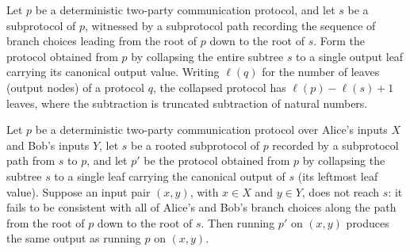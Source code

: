 \begin{lemma}
\label{CommunicationComplexity.Deterministic.Protocol.erasePath_numLeaves}
\leanok
{}
Let $p$ be a deterministic two-party communication protocol, and let $s$ be a
subprotocol of $p$, witnessed by a subprotocol path recording the sequence of branch
choices leading from the root of $p$ down to the root of $s$. Form the protocol obtained
from $p$ by collapsing the entire subtree $s$ to a single output leaf carrying its
canonical output value. Writing $\ell(q)$ for the number of leaves (output nodes) of a
protocol $q$, the collapsed protocol has $\ell(p) - \ell(s) + 1$ leaves, where the
subtraction is truncated subtraction of natural numbers.
\end{lemma}

\begin{lemma}
\label{CommunicationComplexity.Deterministic.Protocol.erasePath_run_outside}
\leanok
{}
Let $p$ be a deterministic two-party communication protocol over Alice's inputs $X$ and
Bob's inputs $Y$, let $s$ be a rooted subprotocol of $p$ recorded by a subprotocol path
from $s$ to $p$, and let $p'$ be the protocol obtained from $p$ by collapsing the
subtree $s$ to a single leaf carrying the canonical output of $s$ (its leftmost leaf
value). Suppose an input pair $(x,y)$, with $x \in X$ and $y \in Y$, does not reach $s$:
it fails to be consistent with all of Alice's and Bob's branch choices along the path
from the root of $p$ down to the root of $s$. Then running $p'$ on $(x,y)$ produces the
same output as running $p$ on $(x,y)$.
\end{lemma}

